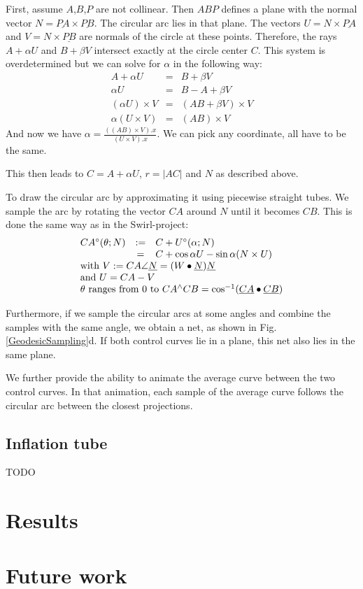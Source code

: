\documentclass[journal, letterpaper]{IEEEtran}
\begin{document}
First, assume $A$,$B$,$P$ are not collinear. Then $ABP$ defines a plane with the normal vector $N=\underline{PA} \times \underline{PB}$. The circular arc lies in that plane. The vectors $U=N \times \underline{PA}$ and $V=N \times \underline{PB}$ are normals of the circle at these points.
Therefore, the rays $A+\alpha U$ and $B+\beta V$ intersect exactly at the circle center $C$.
This system is overdetermined but we can solve for $\alpha$ in the following way:
\begin{equation}
\begin{array}{rcl}
A + \alpha U &=& B + \beta V \\
\alpha U &=& B-A+\beta V \\
(\alpha U) \times V &=& (AB+\beta V) \times V \\
\alpha (U\times V) &=& (AB) \times V
\end{array}
\label{eq:CircArc}
\end{equation}
And now we have $\alpha = \frac{ ((AB)\times V).x }{ (U \times V).x}$. We can pick any coordinate, all have to be the same.

This then leads to $C=A + \alpha U$, $r=|AC|$ and $N$ as described above.

To draw the circular arc by approximating it using piecewise straight tubes. We sample the arc by rotating the vector $CA$ around $N$ until it becomes $CB$. This is done the same way as in the Swirl-project:
\begin{equation}
\begin{array}{lcl}
 CA^{\circ}(\theta; N) &:=& C + U^{\circ}(\alpha; N) \\
                        & =& C + \cos \alpha U - \sin \alpha (N \times U)\\
 \multicolumn{3}{l}{\text{with } V := CA\angle\underline{N} = (W\bullet\underline{N})\underline{N}} \\
 \multicolumn{3}{l}{\text{and } U = CA-V} \\
 \multicolumn{3}{l}{\theta \text{ ranges from } 0 \text{ to } CA^{\wedge}CB=\cos^{-1}(\underline{CA}\bullet\underline{CB})}
\end{array}
\label{eq:Rot}
\end{equation}

Furthermore, if we sample the circular arcs at some angles and combine the samples with the same angle, we obtain a net, as shown in Fig.\ref{GeodesicSampling}d. If both control curves lie in a plane, this net also lies in the same plane.

We further provide the ability to animate the average curve between the two control curves. In that animation, each sample of the average curve follows the circular arc between the closest projections.

\subsection{Inflation tube}
TODO

\section{Results}

\section{Future work}
\end{document}
